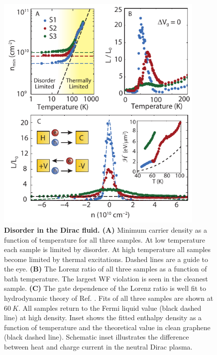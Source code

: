 \begin{figure}
\centering
\includegraphics[width=100mm]{figures/Dirac_fluid/Fig3.pdf}
\caption{\textbf{Disorder in the Dirac fluid.  (A)} Minimum carrier density as a function of temperature for all three samples.  At low temperature each sample is limited by disorder. At high temperature all samples become limited by thermal excitations.  Dashed lines are a guide to the eye. \textbf{(B)} The Lorenz ratio of all three samples as a function of bath temperature. The largest WF violation is seen in the cleanest sample. \textbf{(C)} The gate dependence of the Lorenz ratio is well fit to hydrodynamic theory of Ref. \cite{muller_quantum-critical_2008, foster_slow_2009}. Fits of all three samples are shown at $60~K$. All samples return to the Fermi liquid value (black dashed line) at high density. Inset shows the fitted enthalpy density as a function of temperature and the theoretical value in clean graphene (black dashed line). Schematic inset illustrates the difference between heat and charge current in the neutral Dirac plasma.}
\label{fig:DF_Fig3}
\end{figure}

